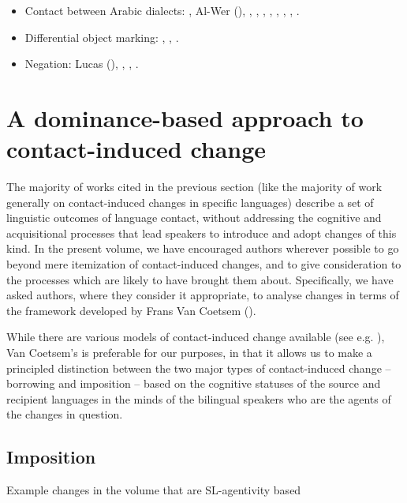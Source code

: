 \documentclass[output=paper]{langsci/langscibook}
\begin{document}
\begin{itemize}[noitemsep,leftmargin=11pt]
\item[\adfhalfrightarrowhead]Contact between Arabic dialects: \citet{Behnstedt1994Dialektkontakt}, Al-Wer (\citeyear{Al-Wer2002furtherreading,Al-Wer2007,Al-Wer2014}), \citet{Gibson2002}, \citet{Miller2007}, \citet{Al-Essa2009}, \citet{Palva2009}, \citet{Vicente2010}, \citet{Alghamdi2014}, \citet{CotterHoresh2015}, \citet{Leddy-Cecere2018}.

\item[\adfhalfrightarrowhead]Differential object marking: \citet{Coghill2014}, \citet{dohla2016}, \citet{Souag2017clitic}.

\item[\adfhalfrightarrowhead]Negation: Lucas (\citeyear{Lucas2007,Lucas2012,Lucas2013}), \citet{Souag2009}, \citet{LucasLash2010}, \citet{BreitbarthWillisLucasinpress}.

\end{itemize}

\section{A dominance-based approach to contact-induced change}\label{introvc}
The majority of works cited in the previous section (like the majority of work generally on contact-induced changes in specific languages) describe a set of linguistic outcomes of language contact, without addressing the cognitive and acquisitional processes that lead speakers to introduce and adopt changes of this kind. In the present volume, we have encouraged authors wherever possible to go beyond mere itemization of contact-induced changes, and to give consideration to the processes which are likely to have brought them about. Specifically, we have asked authors, where they consider it appropriate, to analyse changes in terms of the framework developed by Frans Van Coetsem (\citeyear{VanCoetsem1988,VanCoetsem2000}).

While there are various models of contact-induced change available (see e.g. \citealt{ThomasonKaufman1988,Johanson2002,Matras2009}), Van Coetsem's is preferable for our purposes, in that it allows us to make a principled distinction between the two major types of contact-induced change -- borrowing and imposition -- based on the cognitive statuses of the source and recipient languages in the minds of the bilingual speakers who are the agents of the changes in question.

\subsection{Imposition}
Example changes in the volume that are SL-agentivity based
\end{document}
